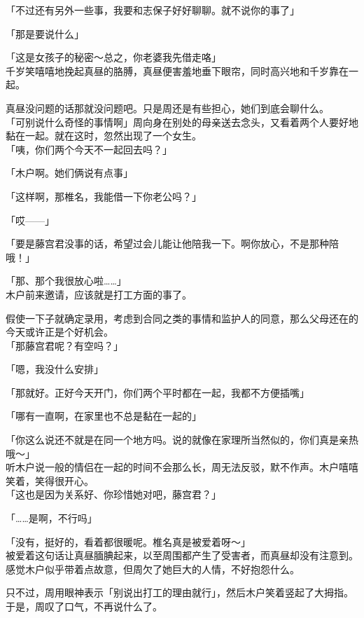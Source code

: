 「不过还有另外一些事，我要和志保子好好聊聊。就不说你的事了」

「那是要说什么」

「这是女孩子的秘密～总之，你老婆我先借走咯」\\

千岁笑嘻嘻地挽起真昼的胳膊，真昼便害羞地垂下眼帘，同时高兴地和千岁靠在一起。

真昼没问题的话那就没问题吧。只是周还是有些担心，她们到底会聊什么。\\

「可别说什么奇怪的事情啊」周向身在别处的母亲送去念头，又看着两个人要好地黏在一起。就在这时，忽然出现了一个女生。\\

「咦，你们两个今天不一起回去吗？」

「木户啊。她们俩说有点事」

「这样啊，那椎名，我能借一下你老公吗？」

「哎——」

「要是藤宫君没事的话，希望过会儿能让他陪我一下。啊你放心，不是那种陪哦！」

「那、那个我很放心啦……」\\

木户前来邀请，应该就是打工方面的事了。

假使一下子就确定录用，考虑到合同之类的事情和监护人的同意，那么父母还在的今天或许正是个好机会。\\

「那藤宫君呢？有空吗？」

「嗯，我没什么安排」

「那就好。正好今天开门，你们两个平时都在一起，我都不方便插嘴」

「哪有一直啊，在家里也不总是黏在一起的」

「你这么说还不就是在同一个地方吗。说的就像在家理所当然似的，你们真是亲热哦～」\\

听木户说一般的情侣在一起的时间不会那么长，周无法反驳，默不作声。木户嘻嘻笑着，笑得很开心。\\

「这也是因为关系好、你珍惜她对吧，藤宫君？」

「……是啊，不行吗」

「没有，挺好的，看着都很暖呢。椎名真是被爱着呀～」\\

被爱着这句话让真昼腼腆起来，以至周围都产生了受害者，而真昼却没有注意到。感觉木户似乎带着点故意，但周欠了她巨大的人情，不好抱怨什么。

只不过，周用眼神表示「别说出打工的理由就行」，然后木户笑着竖起了大拇指。于是，周叹了口气，不再说什么了。
